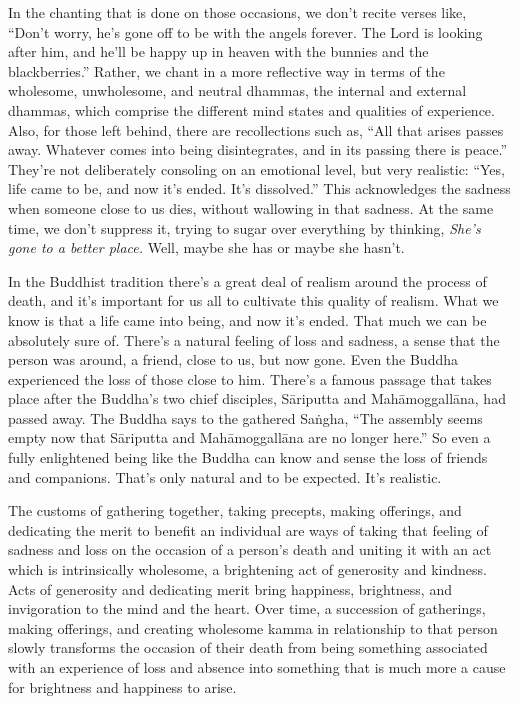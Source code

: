 In the chanting that is done on those occasions, we don't recite verses
like, ``Don't worry, he's gone off to be with the angels forever. The
Lord is looking after him, and he'll be happy up in heaven with the
bunnies and the blackberries.'' Rather, we chant in a more reflective
way in terms of the wholesome, unwholesome, and neutral dhammas, the
internal and external dhammas, which comprise the different mind states
and qualities of experience. Also, for those left behind, there are
recollections such as, ``All that arises passes away. Whatever comes
into being disintegrates, and in its passing there is peace.'' They're
not deliberately consoling on an emotional level, but very realistic:
``Yes, life came to be, and now it's ended. It's \mbox{dissolved.''}
This acknowledges the sadness when someone close to us dies, without
wallowing in that sadness. At the same time, we don't suppress it,
trying to sugar over everything by thinking, \emph{She's gone to a
better place.} Well, maybe she has or maybe she hasn't.

In the Buddhist tradition there's a great deal of realism around the 
process of death, and it's important for us all to cultivate this 
quality of realism. What we know is that a life came into being, and 
now it's ended. That much we can be absolutely sure of. There's a 
natural feeling of loss and sadness, a sense that the person was 
around, a friend, close to us, but now gone. Even the Buddha 
experienced the loss of those close to him. There's a famous passage 
that takes place after the Buddha's two chief disciples, Sāriputta and 
Mahāmoggallāna, had passed away. The Buddha says to the gathered 
Saṅgha, ``The assembly seems empty now that Sāriputta and 
Mahāmoggallāna are no longer here.'' So even a fully enlightened 
being like the Buddha can know and sense the loss of friends and 
companions. That's only natural and to be expected. It's realistic.

The customs of gathering together, taking precepts, making offerings, 
and dedicating the merit to benefit an individual are ways of taking 
that feeling of sadness and loss on the occasion of a person's death 
and uniting it with an act which is intrinsically wholesome, a 
brightening act of generosity and kindness. Acts of generosity and 
dedicating merit bring happiness, brightness, and invigoration to the 
mind and the heart. Over time, a succession of gatherings, making 
offerings, and creating wholesome kamma in relationship to that person 
slowly transforms the occasion of their death from being something 
associated with an experience of loss and absence into something that 
is much more a cause for brightness and happiness to arise.

